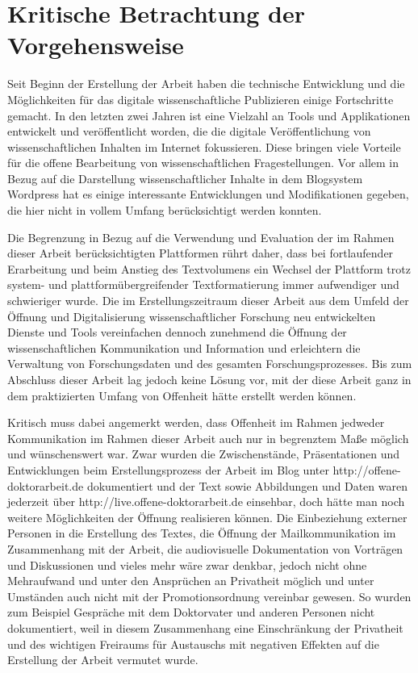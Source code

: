 \section{Kritische Betrachtung der Vorgehensweise}

Seit Beginn der Erstellung der Arbeit haben die technische Entwicklung und die Möglichkeiten für das digitale wissenschaftliche Publizieren einige Fortschritte gemacht. In den letzten zwei Jahren ist eine Vielzahl an Tools und Applikationen entwickelt und veröffentlicht worden, die die digitale Veröffentlichung von wissenschaftlichen Inhalten im Internet fokussieren. Diese bringen viele Vorteile für die offene Bearbeitung von wissenschaftlichen Fragestellungen. Vor allem in Bezug auf die Darstellung wissenschaftlicher Inhalte in dem Blogsystem Wordpress hat es einige interessante Entwicklungen und Modifikationen gegeben, die hier nicht in vollem Umfang berücksichtigt werden konnten.

Die Begrenzung in Bezug auf die Verwendung und Evaluation der im Rahmen dieser Arbeit berücksichtigten Plattformen rührt daher, dass bei fortlaufender Erarbeitung und beim Anstieg des Textvolumens ein Wechsel der Plattform trotz system- und plattformübergreifender Textformatierung immer aufwendiger und schwieriger wurde. Die im Erstellungszeitraum dieser Arbeit aus dem Umfeld der Öffnung und Digitalisierung wissenschaftlicher Forschung neu entwickelten Dienste und Tools vereinfachen dennoch zunehmend die Öffnung der wissenschaftlichen Kommunikation und Information und erleichtern die Verwaltung von Forschungsdaten und des gesamten Forschungsprozesses. Bis zum Abschluss dieser Arbeit lag jedoch keine Lösung vor, mit der diese Arbeit ganz in dem praktizierten Umfang von Offenheit hätte erstellt werden können.

Kritisch muss dabei angemerkt werden, dass Offenheit im Rahmen jedweder Kommunikation im Rahmen dieser Arbeit auch nur in begrenztem Maße möglich und wünschenswert war. Zwar wurden die Zwischenstände, Präsentationen und Entwicklungen beim Erstellungsprozess der Arbeit im Blog unter http://offene-doktorarbeit.de dokumentiert und der Text sowie Abbildungen und Daten waren jederzeit über http://live.offene-doktorarbeit.de einsehbar, doch hätte man noch weitere Möglichkeiten der Öffnung realisieren können. Die Einbeziehung externer Personen in die Erstellung des Textes, die Öffnung der Mailkommunikation im Zusammenhang mit der Arbeit, die audiovisuelle Dokumentation von Vorträgen und Diskussionen und vieles mehr wäre zwar denkbar, jedoch nicht ohne Mehraufwand und unter den Ansprüchen an Privatheit möglich und unter Umständen auch nicht mit der Promotionsordnung vereinbar gewesen. So wurden zum Beispiel Gespräche mit dem Doktorvater und anderen Personen nicht dokumentiert, weil in diesem Zusammenhang eine Einschränkung der Privatheit und des wichtigen Freiraums für Austauschs mit negativen Effekten auf die Erstellung der Arbeit vermutet wurde.

